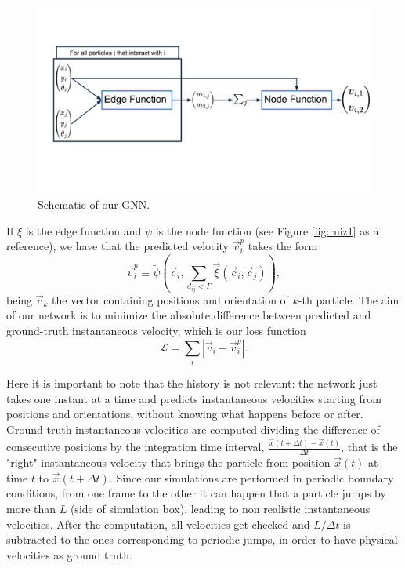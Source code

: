 \documentclass[../../master_thesis_np.tex]{subfiles}
\begin{document}
\begin{figure}[h]
	\centering
	\includegraphics[width=\textwidth]{schema_gnn.png}
	\caption{Schematic of our GNN.}
	\label{fig:schema_gnn}
\end{figure}

If $\xi$ is the edge function and $\psi$ is the node function (see Figure \ref{fig:ruiz1} as a reference), we have that the predicted velocity $\vec{v}_i^p$ takes the form
\begin{equation}
	\vec{v}_i^p \equiv \tilde{\psi} \left( \vec{c}_i, \sum_{d_{ij} < \Gamma} \vec{\xi} (\vec{c}_i, \vec{c}_j) \right),
\end{equation}
being $\vec{c}_k$ the vector containing positions and orientation of $k$-th particle.
The aim of our network is to minimize the absolute difference between predicted and ground-truth instantaneous velocity, which is our loss function
\begin{equation}
	\mathcal{L} = \sum_{i} \left| \vec{v}_i - \vec{v}_i^p \right|.
\end{equation}

Here it is important to note that the history is not relevant: the network just takes one instant at a time and predicts instantaneous velocities starting from positions and orientations, without knowing what happens before or after.
Ground-truth instantaneous velocities are computed dividing the difference of consecutive positions by the integration time interval, $\frac{\vec{x}(t + \Delta t) - \vec{x}(t)}{\Delta t}$, that is the "right" instantaneous velocity that brings the particle from position $\vec{x}(t)$ at time $t$ to $\vec{x}(t + \Delta t)$.
Since our simulations are performed in periodic boundary conditions, from one frame to the other it can happen that a particle jumps by more than $L$ (side of simulation box), leading to non realistic instantaneous velocities.
After the computation, all velocities get checked and $L/\Delta t$ is subtracted to the ones corresponding to periodic jumps, in order to have physical velocities as ground truth.
\end{document}
